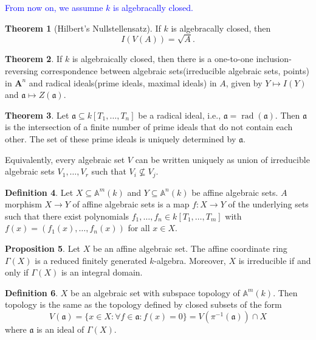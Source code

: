 \documentclass[12pt,a4paper]{book}
\newcommand{\blue}[1]{\textcolor{blue}{#1}}
\theoremstyle{definition}
\newtheorem{defn}{Definition}[section]
\newtheorem{theo}[defn]{Theorem}
\newtheorem{prop}[defn]{Proposition}
\begin{document}
\blue{From now on, we assumne $k$ is algebracally closed.}

\begin{theo}[Hilbert's Nullstellensatz]
    If $k$ is algebracally closed, then
    $$
        I(V(A))=\sqrt{A} .
    $$
\end{theo}
\begin{theo}
    If $k$ is algebraically closed, then there is a one-to-one inclusion-reversing correspondence between algebraic sets(irreducible algebraic sets, points) in $\mathbf{A}^n$ and radical ideals(prime ideals, maximal ideals)  in $A$, given by $Y \mapsto I(Y)$ and $\mathfrak{a} \mapsto Z(\mathfrak{a})$.
\end{theo}
\begin{theo}
    Let $\mathfrak{a} \subseteq k\left[T_1, \ldots, T_n\right]$ be a radical ideal, i.e., $\mathfrak{a}=\operatorname{rad}(\mathfrak{a})$. Then $\mathfrak{a}$ is 
    the intersection of a finite number of prime ideals that do not contain each other. The set of these prime ideals is uniquely determined by $\mathfrak{a}$.

    Equivalently, every algebraic set $V$ can be written uniquely as union of irreducible algebraic sets $V_1,\dots,V_r$ such that $V_i\nsubseteq V_j$.
\end{theo}
\begin{defn}
    Let $X \subseteq \mathbb{A}^m(k)$ and $Y \subseteq \mathbb{A}^n(k)$ be affine algebraic sets. $A$ morphism $X \rightarrow Y$ of affine algebraic sets is a map $f: X \rightarrow Y$ of the underlying sets such that there exist polynomials $f_1, \ldots, f_n \in k\left[T_1, \ldots, T_m\right]$ with $f(x)=\left(f_1(x), \ldots, f_n(x)\right)$ for all $x \in X$.
\end{defn}
\begin{prop}
    Let $X$ be an affine algebraic set. The affine coordinate ring $\Gamma(X)$ is a reduced finitely generated $k$-algebra. Moreover, $X$ is irreducible if and only if $\Gamma(X)$ is an integral domain.
\end{prop}
\begin{defn}
    $X$ be an algebraic set with subspace topology of $\mathbb{A}^m(k)$. Then topology is the same as the topology defined by closed subsets 
    of the form 
    \begin{equation*}
        V(\mathfrak{a})=\{x \in X :\forall f \in \mathfrak{a}: f(x)=0\}=V\left(\pi^{-1}(\mathfrak{a})\right) \cap X
    \end{equation*}
    where $\mathfrak{a}$ is an ideal of $\Gamma(X)$.
\end{defn}
\end{document}
